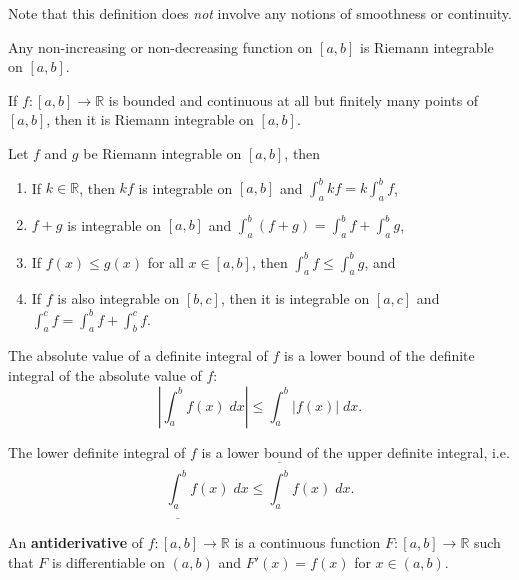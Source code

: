 \documentclass[10pt]{report}
\begin{document}
Note that this definition does \textit{not} involve any notions of smoothness or continuity.

\begin{thrm}{}{}
	Any non-increasing or non-decreasing function on $[a,b]$ is Riemann integrable on $[a,b]$.
\end{thrm}

\begin{thrm}{}{}
	If $f:[a,b]\to\mathbb{R}$ is bounded and continuous at all but finitely many points of $[a,b]$, then it is Riemann integrable on $[a,b]$.
\end{thrm}

\begin{prop}
	\label{prop:integral-props}
	Let $f$ and $g$ be Riemann integrable on $[a,b]$, then
	\begin{enumerate}
		\item If $k\in\mathbb{R}$, then $kf$ is integrable on $[a,b]$ and $\int_{a}^{b} kf = k \int_{a}^{b} f$,
		\item $f+g$ is integrable on $[a,b]$ and $\int_{a}^{b} (f+g)=\int_{a}^{b} f+\int_{a}^{b} g$,
		\item If $f(x) \leq g(x)$ for all $x \in [a,b]$, then $\int_{a}^{b} f \leq \int_{a}^{b} g$, and
		\item If $f$ is also integrable on $[b,c]$, then it is integrable on $[a,c]$ and $\int_{a}^{c} f = \int_{a}^{b} f + \int_{b}^{c} f$.
	\end{enumerate}
\end{prop}

\pagebreak

\begin{cor}
	The absolute value of a definite integral of $f$ is a lower bound of the definite integral of the absolute value of $f$:
	\[
		\left| \int_{a}^{b} f(x) \;dx \right| \leq \int_{a}^{b} |f(x)| \;dx.
	\] 
\end{cor}

\begin{prop}
	The lower definite integral of $f$ is a lower bound of the upper definite integral, i.e.
	\[
		\underline{\int_{a}^{b}} f(x) \;dx \leq \overline{\int_{a}^{b} } f(x) \;dx.
	\] 
\end{prop}

\begin{defn}[]
	An \textbf{antiderivative} of $f:[a,b] \to \mathbb{R}$ is a continuous function $F:[a,b]\to\mathbb{R}$ such that $F$ is differentiable on $(a,b)$ and $F'(x)=f(x)$ for $x\in(a,b)$.
\end{defn}
\end{document}
